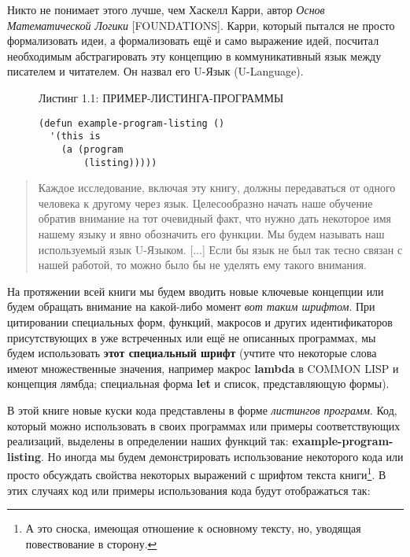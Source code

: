 Никто не понимает этого лучше, чем Хаскелл Карри, автор \emph{Основ Математической Логики} [FOUNDATIONS]. Карри, который пытался не просто формализовать идеи, а формализовать ещё и само выражение идей, посчитал необходимым абстрагировать эту концепцию в ком\-му\-ни\-ка\-тив\-ный язык между писателем и читателем. Он назвал его U-Язык (U-Language).

\begin{figure}Листинг 1.1: ПРИМЕР-ЛИСТИНГА-ПРОГРАММЫ\label{listing_1.1}
\listbegin
\begin{verbatim}
(defun example-program-listing ()
  '(this is
    (a (program
        (listing)))))
\end{verbatim}
\listend
\end{figure}

\begin{quote}
Каждое исследование, включая эту книгу, должны пе\-ре\-да\-ва\-ться от одного человека к другому через язык. Целесообразно начать наше обучение обратив внимание на тот очевидный факт, что нужно дать некоторое имя нашему языку и явно обозначить его функции. Мы будем называть наш ис\-поль\-зуемый язык U-Языком. [...] Если бы язык не был так тесно связан с нашей работой, то можно было бы не уделять ему такого внимания.
\end{quote}

На протяжении всей книги мы будем вводить новые ключевые кон\-цеп\-ции или будем обращать внимание на какой-либо момент \emph{вот таким шриф\-том}. При цитировании специальных форм, функций, макросов и других иден\-тификаторов присутствующих в уже встреченных или ещё не опи\-сан\-ных программах, мы будем использовать \textbf{этот спе\-циаль\-ный шри\-фт} (уч\-тите что некоторые слова имеют множественные значения, на\-при\-мер мак\-рос \textbf{lambda} в COMMON LISP и концепция лямбда; спе\-циаль\-ная форма \textbf{let} и список, представляющую формы).

В этой книге новые куски кода представлены в форме \emph{листингов программ}. Код, который можно использовать в своих программах или примеры соответствующих реализаций, выделены в определении наших функций так: \textbf{example-program-listing}. Но иногда мы будем демонстрировать использование некоторого кода или просто обсуждать свойства некоторых выражений с шрифтом текста книги\footnote{А это сноска, имеющая отношение к основному тексту, но, уводящая повествование в сторону.}. В этих случаях код или примеры использования кода будут отображаться так:


